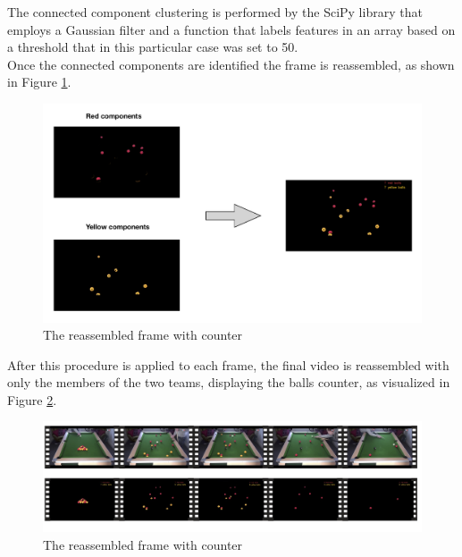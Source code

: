\documentclass{usiinftr}
\begin{document}
\noindent
The connected component clustering is performed by the SciPy library that employs a Gaussian filter and a function that labels features in an array based on a threshold that in this particular case was set to 50. \\
Once the connected components are identified the frame is reassembled, as shown in Figure \ref{fig:8}. 
\begin{figure}[h]
	\centering
	\includegraphics[width=0.8\linewidth]{./img/to_frame}
	\caption{The reassembled frame with counter}
	\label{fig:8}
\end{figure}
After this procedure is applied to each frame, the final video is reassembled with only the members of the two teams, displaying the balls counter, as visualized in Figure \ref{fig:10}. 
\begin{figure}[h]
	\centering
	\includegraphics[width=0.8\linewidth]{./img/frames}
	\caption{The reassembled frame with counter}
	\label{fig:10}
\end{figure}
\end{document}
